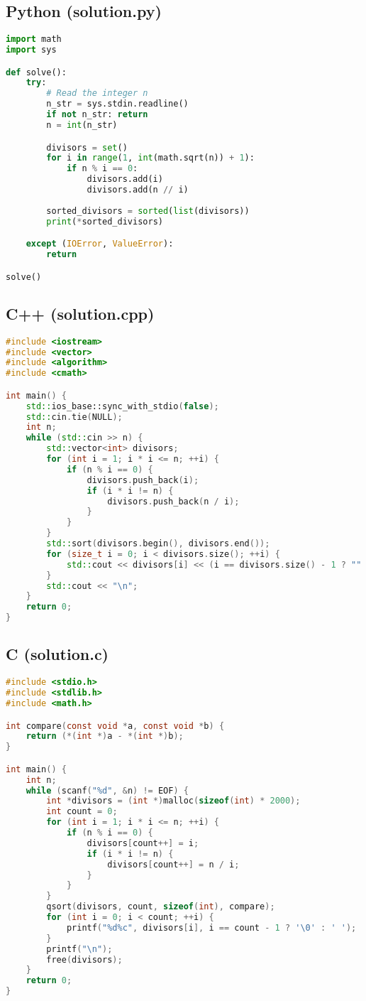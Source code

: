 \documentclass[11pt,a4paper]{article}
\begin{document}
\subsection*{Python (solution.py)}
\begin{lstlisting}[language=Python]
import math
import sys

def solve():
    try:
        # Read the integer n
        n_str = sys.stdin.readline()
        if not n_str: return
        n = int(n_str)

        divisors = set()
        for i in range(1, int(math.sqrt(n)) + 1):
            if n % i == 0:
                divisors.add(i)
                divisors.add(n // i)
        
        sorted_divisors = sorted(list(divisors))
        print(*sorted_divisors)

    except (IOError, ValueError):
        return

solve()
\end{lstlisting}

\subsection*{C++ (solution.cpp)}
\begin{lstlisting}[language=C++]
#include <iostream>
#include <vector>
#include <algorithm>
#include <cmath>

int main() {
    std::ios_base::sync_with_stdio(false);
    std::cin.tie(NULL);
    int n;
    while (std::cin >> n) {
        std::vector<int> divisors;
        for (int i = 1; i * i <= n; ++i) {
            if (n % i == 0) {
                divisors.push_back(i);
                if (i * i != n) {
                    divisors.push_back(n / i);
                }
            }
        }
        std::sort(divisors.begin(), divisors.end());
        for (size_t i = 0; i < divisors.size(); ++i) {
            std::cout << divisors[i] << (i == divisors.size() - 1 ? "" : " ");
        }
        std::cout << "\n";
    }
    return 0;
}
\end{lstlisting}

\subsection*{C (solution.c)}
\begin{lstlisting}[language=C]
#include <stdio.h>
#include <stdlib.h>
#include <math.h>

int compare(const void *a, const void *b) {
    return (*(int *)a - *(int *)b);
}

int main() {
    int n;
    while (scanf("%d", &n) != EOF) {
        int *divisors = (int *)malloc(sizeof(int) * 2000);
        int count = 0;
        for (int i = 1; i * i <= n; ++i) {
            if (n % i == 0) {
                divisors[count++] = i;
                if (i * i != n) {
                    divisors[count++] = n / i;
                }
            }
        }
        qsort(divisors, count, sizeof(int), compare);
        for (int i = 0; i < count; ++i) {
            printf("%d%c", divisors[i], i == count - 1 ? '\0' : ' ');
        }
        printf("\n");
        free(divisors);
    }
    return 0;
}
\end{lstlisting}
\end{document}

